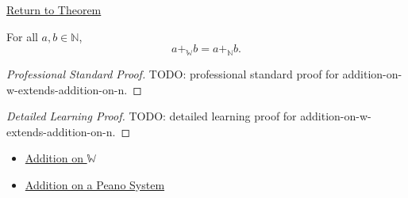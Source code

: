 \newpage
{}
\label{prf:addition-on-w-extends-addition-on-n}

\begin{remark*}[Return]
\hyperref[thm:addition-on-w-extends-addition-on-n]{Return to Theorem}
\end{remark*}

\begin{theorem*}
For all $a,b\in\mathbb{N}$,
\[
a+_{\mathbb{W}}b=a+_{\mathbb{N}}b.
\]
\end{theorem*}

\begin{proof}[Professional Standard Proof]
\LRAProofBodyStart
TODO: professional standard proof for addition-on-w-extends-addition-on-n.
\end{proof}

\begin{proof}[Detailed Learning Proof]
\LRAProofBodyStart
TODO: detailed learning proof for addition-on-w-extends-addition-on-n.
\end{proof}

\begin{remark*}
\end{remark*}

\begin{dependencies}
\begin{itemize}
  \item \hyperref[def:addition-on-w]{Addition on $\mathbb{W}$}
  \item \hyperref[def:addition-on-peano-system]{Addition on a Peano System}
\end{itemize}
\end{dependencies}

\clearpage
